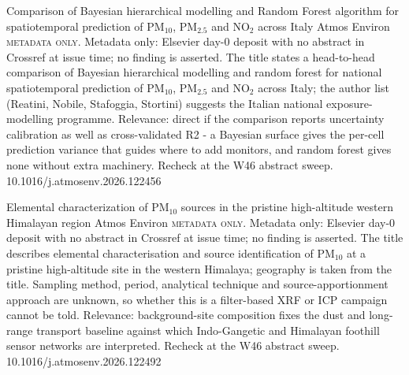 \documentclass[10pt]{article}
\begin{document}
{Comparison of Bayesian hierarchical modelling and Random Forest algorithm for spatiotemporal prediction of PM$_{10}$, PM$_{2.5}$ and NO$_2$ across Italy}
{Atmos Environ}
{\textsc{metadata only.} Metadata only: Elsevier day-0 deposit with no abstract in Crossref at issue time; no finding is asserted. The title states a head-to-head comparison of Bayesian hierarchical modelling and random forest for national spatiotemporal prediction of PM$_{10}$, PM$_{2.5}$ and NO$_2$ across Italy; the author list (Reatini, Nobile, Stafoggia, Stortini) suggests the Italian national exposure-modelling programme. Relevance: direct if the comparison reports uncertainty calibration as well as cross-validated R2 - a Bayesian surface gives the per-cell prediction variance that guides where to add monitors, and random forest gives none without extra machinery. Recheck at the W46 abstract sweep.}
{10.1016/j.atmosenv.2026.122456}

{Elemental characterization of PM$_{10}$ sources in the pristine high-altitude western Himalayan region}
{Atmos Environ}
{\textsc{metadata only.} Metadata only: Elsevier day-0 deposit with no abstract in Crossref at issue time; no finding is asserted. The title describes elemental characterisation and source identification of PM$_{10}$ at a pristine high-altitude site in the western Himalaya; geography is taken from the title. Sampling method, period, analytical technique and source-apportionment approach are unknown, so whether this is a filter-based XRF or ICP campaign cannot be told. Relevance: background-site composition fixes the dust and long-range transport baseline against which Indo-Gangetic and Himalayan foothill sensor networks are interpreted. Recheck at the W46 abstract sweep.}
{10.1016/j.atmosenv.2026.122492}

\par{}\baselineskip{}\baselineskip
{}
\end{document}
